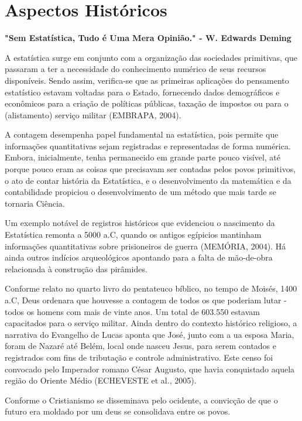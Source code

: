 \section{Aspectos Históricos}
\textbf{"Sem Estatística, Tudo é Uma Mera Opinião."  - W. Edwards Deming} \vskip0.3cm

A estatística surge em conjunto com a organização das sociedades primitivas, que passaram a ter a necessidade do conhecimento numérico de seus recursos disponíveis.  Sendo assim, verifica-se que as primeiras aplicações do pensamento estatístico estavam voltadas para o Estado, fornecendo dados demográficos e econômicos para a criação de políticas públicas, taxação de impostos ou para o (alistamento) serviço militar (EMBRAPA, 2004).\vskip0.3cm

A contagem desempenha papel fundamental na estatística, pois permite que informações quantitativas sejam registradas e representadas de forma numérica. Embora, inicialmente, tenha permanecido em grande parte pouco visível, até porque pouco eram as coisas que precisavam ser contadas pelos povos primitivos, o ato de contar história da Estatística, e o desenvolvimento da matemática e da contabilidade propiciou o desenvolvimento de um método que mais tarde se tornaria Ciência.\vskip0.3cm

Um exemplo notável de registros históricos que evidenciou o nascimento da Estatística remonta a 5000 a.C, quando os antigos egípicios mantinham informações quantitativas sobre prisioneiros de guerra (MEMÓRIA, 2004). Há ainda outros indícios arqueológicos apontando para a falta de mão-de-obra relacionada à construção das pirâmides.\vskip0.3cm

Conforme relato no quarto livro do pentateuco bíblico, no tempo de Moisés, 1400 a.C, Deus ordenara que houvesse a contagem de todos os que poderiam lutar - todos os homens com mais de vinte anos. Um total de 603.550 estavam capacitados para o serviço militar. Ainda dentro do contexto histórico religioso, a narrativa do Evangelho de Lucas aponta que José, junto com a ua esposa Maria, foram de Nazaré até Belém, local onde nasceu Jesus, para serem contados e registrados com fins de tributação e controle administrativo. Este censo foi convocado pelo Imperador romano César Augusto, que havia conquistado aquela região do Oriente Médio (ECHEVESTE et al., 2005).


\newpage
Conforme o Cristianismo se disseminava pelo ocidente, a convicção de que o futuro era moldado por um deus se consolidava entre os povos.\vskip0.3cm

